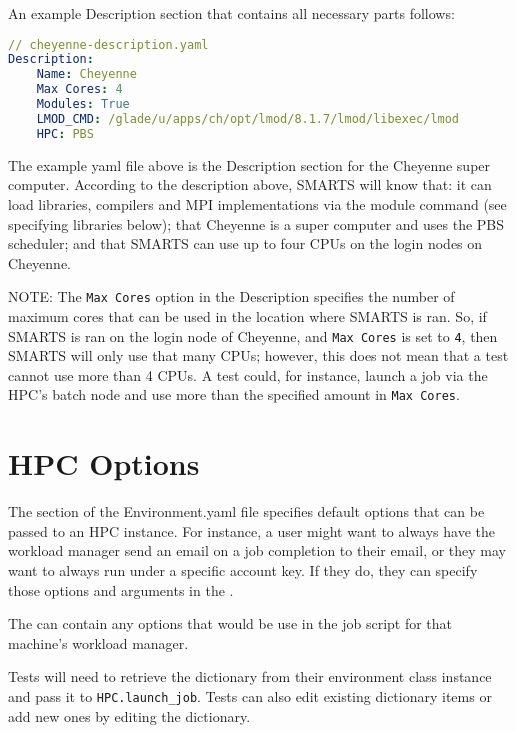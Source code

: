 An example Description section that contains all necessary parts follows:

\begin{lstlisting}[language=yaml, 
                   caption={Examlpe Cheyenne Environment.yaml Description},
                   label={lst:cheyenne_desc_example}]
// cheyenne-description.yaml
Description:
    Name: Cheyenne
    Max Cores: 4
    Modules: True
    LMOD_CMD: /glade/u/apps/ch/opt/lmod/8.1.7/lmod/libexec/lmod
    HPC: PBS
\end{lstlisting}

The example yaml file above is the Description section for the Cheyenne super
computer. According to the description above, SMARTS will know that: it can
load libraries, compilers and MPI implementations via the module command (see
specifying libraries below); that Cheyenne is a super computer and uses the PBS
scheduler; and that SMARTS can use up to four CPUs on the login nodes on
Cheyenne.

NOTE: The {\tt Max Cores} option in the Description specifies the number of
maximum cores that can be used in the location where SMARTS is ran. So, if
SMARTS is ran on the login node of Cheyenne, and {\tt Max Cores} is set to
{\tt 4}, then SMARTS will only use that many CPUs; however, this does not mean
that a test cannot use more than 4 CPUs. A test could, for instance, launch a
job via the HPC's batch node and use more than the specified amount in {\tt Max
Cores}.

\section{HPC Options}
\label{sec:hpc_options}

The \hpcoptions section of the Environment.yaml file specifies default options
that can be passed to an HPC instance. For instance, a user might want to
always have the workload manager send an email on a job completion to their
email, or they may want to always run under a specific account key. If they do,
they can specify those options and arguments in the \hpcoptions.

The \hpcoptions can contain any options that would be use in the job script for
that machine's workload manager.

Tests will need to retrieve the \hpcoptions dictionary from their environment
class instance and pass it to {\tt HPC.launch\_job}. Tests can also edit
existing dictionary items or add new ones by editing the \hpcoptions
dictionary.

